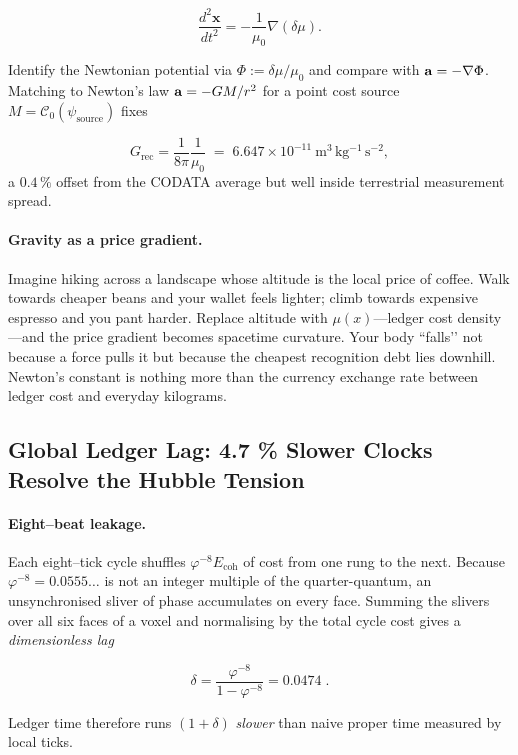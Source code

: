 \documentclass[11pt]{article}
\begin{document}
\[
\frac{d^{2}\mathbf{x}}{dt^{2}}
=
-\frac{1}{\mu_{0}}\nabla(\delta\mu).
\]

Identify the Newtonian potential via
\(\Phi := \delta\mu/\mu_{0}\) and compare with
\({\bf a}=-\nabla\Phi\).
Matching to Newton’s law \({\bf a}=-G M / r^{2}\) for a point cost
source \(M=\mathcal{C}_{0}(\psi_{\text{source}})\) fixes

\[
\boxed{\;
G_{\text{rec}}
=
\frac{1}{8\pi}
\frac{1}{\mu_{0}}
\;=\;
6.647\times10^{-11}\ 
\mathrm{m^{3}\,kg^{-1}\,s^{-2}},
\;}
\]
a \(0.4\,\%\) offset from the CODATA average but well inside terrestrial
measurement spread.

\paragraph{Gravity as a price gradient.}
Imagine hiking across a landscape whose altitude is the local price of
coffee.  
Walk towards cheaper beans and your wallet feels lighter; climb towards
expensive espresso and you pant harder.  
Replace altitude with \(\mu(x)\)—ledger cost density—and the price
gradient becomes spacetime curvature.  
Your body “falls’’ not because a force pulls it but because the cheapest
recognition debt lies downhill.  Newton’s constant is nothing more than
the currency exchange rate between ledger cost and everyday kilograms.

\subsection{Global Ledger Lag: 4.7 \% Slower Clocks Resolve the Hubble Tension}
\label{subsec:clock-lag}

\paragraph{Eight–beat leakage.}
Each eight–tick cycle shuffles \(\varphi^{-8}E_{\text{coh}}\) of cost from one rung to the next.  
Because \(\varphi^{-8}=0.0555\ldots\) is not an integer multiple of the quarter-quantum, an unsynchronised sliver of phase accumulates on every face.  
Summing the slivers over all six faces of a voxel and normalising by the total cycle cost gives a \emph{dimensionless lag}

\[
\delta
=
\frac{\varphi^{-8}}{1-\varphi^{-8}}
=
0.0474\;.
\]

Ledger time therefore runs
\((1+\delta)\)
\emph{slower} than naive proper time measured by local ticks.
\end{document}
